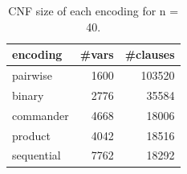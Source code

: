 \begin{table}[t]
\centering
\caption{CNF size of each encoding for n = 40.}
\label{tab:structure}
\begin{tabular}{lrr}
\toprule
encoding & \#vars & \#clauses \\
\midrule
pairwise & 1600 & 103520 \\
binary & 2776 & 35584 \\
commander & 4668 & 18006 \\
product & 4042 & 18516 \\
sequential & 7762 & 18292 \\
\bottomrule
\end{tabular}
\end{table}
